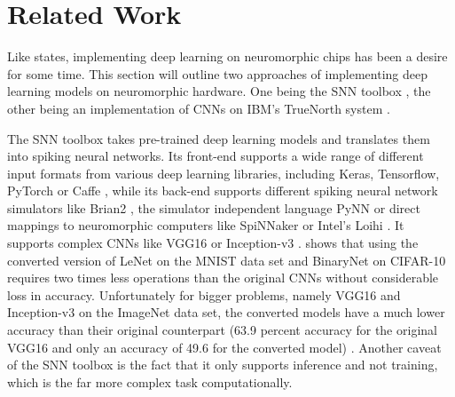\documentclass[]{article}
\begin{document}



\section{Related Work} %
\label{sec:related_work}

Like \citet{gomes_2017} states, implementing deep learning on
neuromorphic chips has been a desire for some time.
This section will outline two approaches of implementing deep learning
models on neuromorphic hardware.
One being the SNN toolbox \citep{rueckauer_et_al_2017}, the other
being an implementation of CNNs on IBM's TrueNorth system
\citep{esser_et_al_2016}.

The SNN toolbox takes pre-trained deep learning models and translates
them into spiking neural networks.
Its front-end supports a wide range of different input formats from
various deep learning libraries, including Keras, Tensorflow, PyTorch
or Caffe \citep{jia_et_al_2014}, while its back-end supports different
spiking neural network simulators like Brian2
\citep{stimberg_et_al_2019}, the simulator independent language PyNN
\citep{davison_et_al_2009} or direct mappings to neuromorphic
computers like SpiNNaker or Intel's Loihi
\citep{davies_et_al_2018, snn_toolbox_2020}.
It supports complex CNNs like VGG16 or Inception-v3
\citep{szegedy_et_al_2015, rueckauer_et_al_2017}.
\citet{rueckauer_et_al_2017} shows that using the converted version of
LeNet \citep{lecun_et_al_1989} on the MNIST data set
\citep{lecun_et_al_2020} and BinaryNet \citep{courbariaux_et_al_2016}
on CIFAR-10 \citep{krizhevsky_2009} requires two times
less operations than the original CNNs without considerable loss in
accuracy.
Unfortunately for bigger problems, namely VGG16 and Inception-v3 on
the ImageNet data set, the converted models have a much lower accuracy
than their original counterpart (63.9 percent accuracy for the
original VGG16 and only an accuracy of 49.6 for the converted model)
\citep{rueckauer_et_al_2017}.
Another caveat of the SNN toolbox is the fact that it only supports
inference and not training, which is the far more complex task
computationally.
\end{document}
